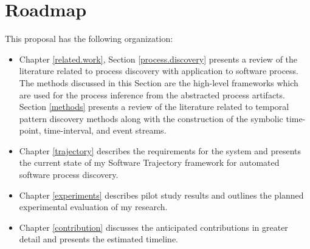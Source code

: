 \section{Roadmap}
This proposal has the following organization:
\begin{itemize}
	\item Chapter \ref{related.work}, Section \ref{process.discovery} presents a review of the literature related to process discovery with application to software process. The methods discussed in this Section are the high-level frameworks which are used for the process inference from the abstracted process artifacts. Section \ref{methods} presents a review of the literature related to temporal pattern discovery methods along with the construction of the symbolic time-point, time-interval, and event streams.
	\item Chapter \ref{trajectory} describes the requirements for the system and presents the current state of my Software Trajectory framework for automated software process discovery.
	\item Chapter \ref{experiments} describes pilot study results and outlines the planned experimental evaluation of my research.
	\item Chapter \ref{contribution} discusses the anticipated contributions in greater detail and presents the estimated timeline.
\end{itemize}
